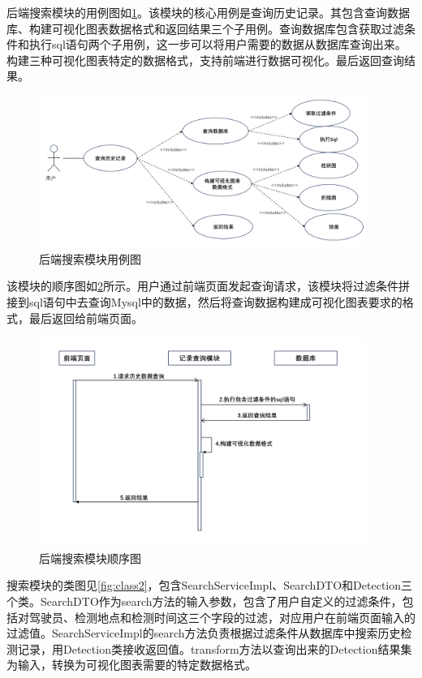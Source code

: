 后端搜索模块的用例图如\ref{fig:uml4}。该模块的核心用例是查询历史记录。其包含查询数据库、构建可视化图表数据格式和返回结果三个子用例。查询数据库包含获取过滤条件和执行sql语句两个子用例，这一步可以将用户需要的数据从数据库查询出来。构建三种可视化图表特定的数据格式，支持前端进行数据可视化。最后返回查询结果。

\begin{figure}[!htb]
    \centering
    \includegraphics[width=0.95\textwidth]{figs/chap05/uml4.png}
    \caption{后端搜索模块用例图}
    \label{fig:uml4}
\end{figure}

该模块的顺序图如\ref{fig:seq4}所示。用户通过前端页面发起查询请求，该模块将过滤条件拼接到sql语句中去查询Mysql中的数据，然后将查询数据构建成可视化图表要求的格式，最后返回给前端页面。

\begin{figure}[h]
    \centering
    \includegraphics[width=0.95\textwidth]{figs/chap05/seq4.png}
    \caption{后端搜索模块顺序图}
    \label{fig:seq4}
\end{figure}

搜索模块的类图见\ref{fig:class2}，包含SearchServiceImpl、SearchDTO和Detection三个类。SearchDTO作为search方法的输入参数，包含了用户自定义的过滤条件，包括对驾驶员、检测地点和检测时间这三个字段的过滤，对应用户在前端页面输入的过滤值。SearchServiceImpl的search方法负责根据过滤条件从数据库中搜索历史检测记录，用Detection类接收返回值。transform方法以查询出来的Detection结果集为输入，转换为可视化图表需要的特定数据格式。


